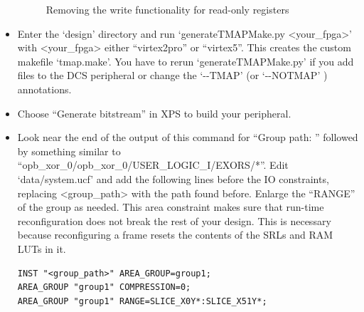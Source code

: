 \documentclass[a4paper,oneside]{memoir}
\begin{document}
\begin{itemize}
\begin{figure}[H]
\caption{Removing the write functionality for read-only registers\label{fig:design1}}
\end{figure}
\item Enter the `design' directory and run `generateTMAPMake.py <your\_fpga>' with <your\_fpga> either ``virtex2pro'' or ``virtex5''. This creates the custom makefile `tmap.make'. You have to rerun `generateTMAPMake.py' if you add files to the DCS peripheral or change the `-\--TMAP' (or `-\--NOTMAP'  ) annotations.
\item Choose ``Generate bitstream'' in XPS to build your peripheral.
\item Look near the end of the output of this command for ``Group path: '' followed by something similar to ``opb\_xor\_0/opb\_xor\_0/USER\_LOGIC\_I/EXORS/*''.
Edit `data/system.ucf' and add the following lines before the IO constraints, replacing <group\_path> with the path found before. Enlarge the ``RANGE'' of the group as needed. This area constraint makes sure that  run-time reconfiguration does not break the rest of your design. This is necessary because reconfiguring a frame resets the contents of the SRLs and RAM LUTs in it. 

\lstset{language=}
\begin{lstlisting}
INST "<group_path>" AREA_GROUP=group1;
AREA_GROUP "group1" COMPRESSION=0;
AREA_GROUP "group1" RANGE=SLICE_X0Y*:SLICE_X51Y*;
\end{lstlisting}


\end{itemize}
\end{document}
